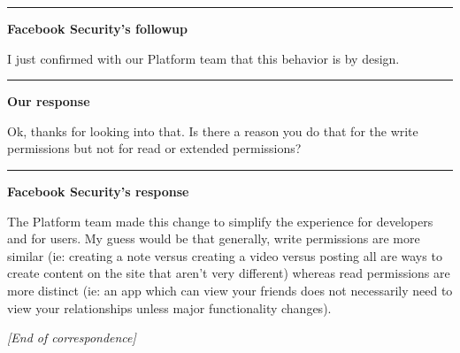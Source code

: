 \documentclass[10pt]{sig-alternate-10pt}
\begin{document}
\noindent\rule{6cm}{0.4pt}

\noindent\textbf{Facebook Security's followup}

\noindent I just confirmed with our Platform team that this behavior is by design.

\noindent\rule{6cm}{0.4pt}

\noindent\textbf{Our response}

\noindent Ok, thanks for looking into that. Is there a reason you do that for the write permissions but not for read or extended permissions?

\noindent\rule{6cm}{0.4pt}

\noindent\textbf{Facebook Security's response}

\noindent The Platform team made this change to simplify the experience for developers and for users. My guess would be that generally, write permissions are more similar (ie: creating a note versus creating a video versus posting all are ways to create content on the site that aren't very different) whereas read permissions are more distinct (ie: an app which can view your friends does not necessarily need to view your relationships unless major functionality changes).

\noindent \textit{[End of correspondence]}
\end{document}
